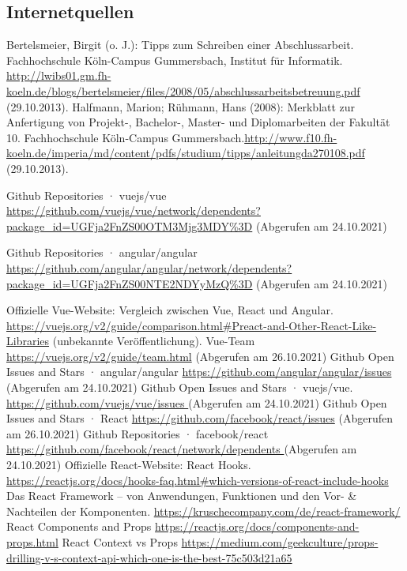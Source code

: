 \subsection{Internetquellen}
\begin{thebibliography}{HR08} %
  Bertelsmeier, Birgit (o. J.): Tipps zum Schrei\-b\-en ei\-n\-er Ab\-sch\-luss\-ar\-beit. Fach\-hoch\-schu\-le Köln-Campus Gummersbach, Institut für Informatik. \url{http://lwibs01.gm.fh-koeln.de/blogs/bertelsmeier/files/2008/05/abschlussarbeitsbetreuung.pdf} (29.10.2013).
   Halfmann, Marion; Rühmann, Hans (2008): Merkblatt zur Anfertigung von Projekt-, Bachelor-, Master- und Diplomarbeiten der Fakultät 10. Fachhochschule Köln-Campus Gummersbach.\url{http://www.f10.fh-koeln.de/imperia/md/content/pdfs/studium/tipps/anleitungda270108.pdf} (29.10.2013).




   Github Repositories · vuejs/vue \url{ https://github.com/vuejs/vue/network/dependents?package_id=UGFja2FnZS00OTM3Mjg3MDY\%3D}
  (Abgerufen am 24.10.2021)

   Github Repositories · angular/angular \url{https://github.com/angular/angular/network/dependents?package_id=UGFja2FnZS00NTE2NDYyMzQ%3D}
  (Abgerufen am 24.10.2021)

   Offizielle Vue-Website: Vergleich zwischen Vue, React und Angular. \url{https://vuejs.org/v2/guide/comparison.html#Preact-and-Other-React-Like-Libraries} (unbekannte Veröffentlichung).
   Vue-Team \url{https://vuejs.org/v2/guide/team.html} (Abgerufen am 26.10.2021)
  Github Open Issues and Stars · angular/angular \url{ https://github.com/angular/angular/issues }  (Abgerufen am 24.10.2021)
   Github Open Issues and Stars · vuejs/vue. \url{ https://github.com/vuejs/vue/issues }  (Abgerufen am 24.10.2021)
   Github Open Issues and Stars · React \url{https://github.com/facebook/react/issues} (Abgerufen am 26.10.2021)
   Github Repositories · facebook/react \url{ https://github.com/facebook/react/network/dependents } (Abgerufen am 24.10.2021)
   Offizielle React-Website: React Hooks. \url{https://reactjs.org/docs/hooks-faq.html#which-versions-of-react-include-hooks}
   Das React Framework – von Anwendungen, Funktionen und den Vor- & Nachteilen der Komponenten. \url{https://kruschecompany.com/de/react-framework/}
   React Components and Props \url{https://reactjs.org/docs/components-and-props.html}
   React Context vs Props \url{https://medium.com/geekculture/props-drilling-v-s-context-api-which-one-is-the-best-75c503d21a65}
  



\end{thebibliography}
